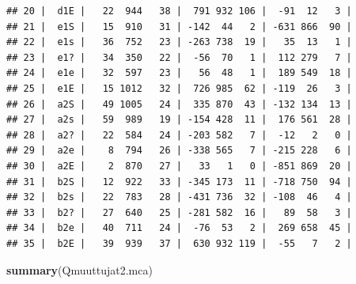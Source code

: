 \documentclass[
  finnish,
]{book}
\newenvironment{Shaded}{\begin{snugshade}}{\end{snugshade}}
\newcommand{\KeywordTok}[1]{\textcolor[rgb]{0.13,0.29,0.53}{\textbf{#1}}}
\newcommand{\NormalTok}[1]{#1}
\begin{document}
\begin{verbatim}
## 20 |  d1E |   22  944   38 |  791 932 106 |  -91  12   3 |
## 21 |  e1S |   15  910   31 | -142  44   2 | -631 866  90 |
## 22 |  e1s |   36  752   23 | -263 738  19 |   35  13   1 |
## 23 |  e1? |   34  350   22 |  -56  70   1 |  112 279   7 |
## 24 |  e1e |   32  597   23 |   56  48   1 |  189 549  18 |
## 25 |  e1E |   15 1012   32 |  726 985  62 | -119  26   3 |
## 26 |  a2S |   49 1005   24 |  335 870  43 | -132 134  13 |
## 27 |  a2s |   59  989   19 | -154 428  11 |  176 561  28 |
## 28 |  a2? |   22  584   24 | -203 582   7 |  -12   2   0 |
## 29 |  a2e |    8  794   26 | -338 565   7 | -215 228   6 |
## 30 |  a2E |    2  870   27 |   33   1   0 | -851 869  20 |
## 31 |  b2S |   12  922   33 | -345 173  11 | -718 750  94 |
## 32 |  b2s |   22  783   28 | -431 736  32 | -108  46   4 |
## 33 |  b2? |   27  640   25 | -281 582  16 |   89  58   3 |
## 34 |  b2e |   40  711   24 |  -76  53   2 |  269 658  45 |
## 35 |  b2E |   39  939   37 |  630 932 119 |  -55   7   2 |
\end{verbatim}

\begin{Shaded}
\begin{Highlighting}[]
\KeywordTok{summary}\NormalTok{(Qmuuttujat2.mca)}
\end{Highlighting}
\end{Shaded}
\end{document}
